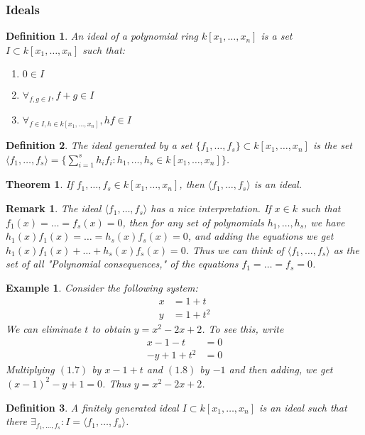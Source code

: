 \documentclass{article}
\theoremstyle{mystyle}
\newtheorem{theorem}{Theorem}[section]
\newtheorem{definition}{Definition}[section]
\newtheorem{example}{Example}[section]
\newtheorem{remark}{Remark}[section]
\begin{document}
\subsubsection{Ideals}
\begin{definition}
An ideal of a polynomial ring $k[x_1,\hdots ,x_n]$ is a set $I\subset k[x_1,\hdots ,x_n]$ such that:
\begin{enumerate}
    \item $0\in I$
    \item $\forall_{f,g\in I}, f+g\in I$ 
    \item $\forall_{f\in I, h\in k[x_1,\hdots ,x_n]}, hf\in I$
\end{enumerate}
\end{definition}
\begin{definition}
The ideal generated by a set $\{f_1,\hdots, f_s\} \subset k[x_1,\hdots ,x_n]$ is the set $\langle f_1,\hdots, f_s\rangle = \{\sum_{i=1}^{s} h_i f_i:h_1,\hdots, h_s\in k[x_1,\hdots ,x_n]\}$.
\end{definition}
\begin{theorem}
If $f_1,\hdots, f_s\in k[x_1,\hdots ,x_n]$, then $\langle f_1,\hdots, f_s\rangle$ is an ideal.
\end{theorem}
\begin{remark}
The ideal $\langle f_1,\hdots, f_s\rangle$ has a nice interpretation. If $x\in k$ such that $f_1(x) = \hdots = f_s(x) = 0$, then for any set of polynomials $h_1,\hdots, h_s$, we have $h_1(x)f_1(x) = \hdots = h_s(x)f_s(x) = 0$, and adding the equations we get $h_1(x)f_1(x)+\hdots + h_s(x)f_s(x) = 0$. Thus we can think of $\langle f_1,\hdots, f_s\rangle$ as the set of all "Polynomial consequences," of the equations $f_1 = \hdots = f_s = 0$.
\end{remark}
\begin{example}
Consider the following system:
\begin{align*}
    x &= 1+t \\
    y &= 1+t^2
\end{align*}
We can eliminate $t$ to obtain $y = x^2-2x+2$. To see this, write
\begin{align*}
    x - 1 - t &= 0 \\
    -y+1+t^2 &=0
\end{align*}
Multiplying $(1.7)$ by $x-1+t$ and $(1.8)$ by $-1$ and then adding, we get $(x-1)^2-y+1 = 0$. Thus $y = x^2-2x+2$.
\end{example}
\begin{definition}
A finitely generated ideal $I\subset k[x_1,\hdots ,x_n]$ is an ideal such that there $\exists_{f_1,\hdots, f_s}: I = \langle f_1,\hdots, f_s\rangle$.
\end{definition}
\end{document}
